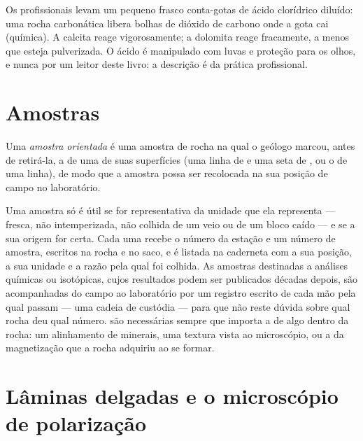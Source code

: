 Os profissionais levam um pequeno frasco conta-gotas de ácido clorídrico diluído: uma rocha carbonática libera bolhas de dióxido de carbono onde a gota cai (química). A calcita reage vigorosamente; a dolomita reage fracamente, a menos que esteja pulverizada.
O ácido é manipulado com luvas e proteção para os olhos, e nunca por um leitor deste livro: a descrição é da prática profissional.

\section{Amostras}

\begin{definition}\label{def:b1:field-lab-methods-1:sample}
Uma \emph{amostra orientada} é uma amostra de rocha na qual o geólogo marcou, antes de retirá-la, a  de uma de suas superfícies (uma linha de  e uma seta de , ou o  de uma linha), de modo que a amostra possa ser recolocada na sua posição de campo no laboratório.
\end{definition}

Uma amostra só é útil se for representativa da unidade que ela representa --- fresca, não intemperizada, não colhida de um veio ou de um bloco caído --- e se a sua origem for certa. Cada uma recebe o número da estação e um número de amostra, escritos na rocha e no saco, e é listada na caderneta com a sua posição, a sua unidade e a razão pela qual foi colhida. As amostras destinadas a análises químicas ou isotópicas, cujos resultados podem ser publicados décadas depois, são acompanhadas do campo ao laboratório por um registro escrito de cada mão pela qual passam --- uma cadeia de custódia --- para que não reste dúvida sobre qual rocha deu qual número.  são necessárias sempre que importa a  de algo dentro da rocha: um alinhamento de minerais, uma textura vista ao microscópio, ou a  da magnetização que a rocha adquiriu ao se formar.

\section{Lâminas delgadas e o microscópio de polarização}

